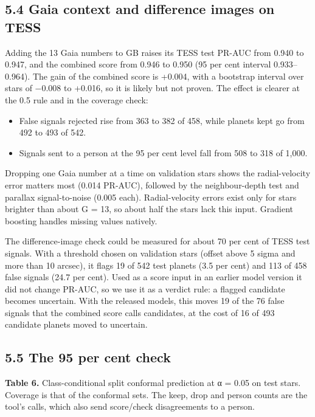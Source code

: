 \documentclass[
]{article}
\providecommand{\tightlist}{%
  \setlength{\itemsep}{0pt}\setlength{\parskip}{0pt}}
\begin{document}
\hypertarget{gaia-context-and-difference-images-on-tess}{%
\subsection{5.4 Gaia context and difference images on
TESS}\label{gaia-context-and-difference-images-on-tess}}

Adding the 13 Gaia numbers to GB raises its TESS test PR-AUC from 0.940
to 0.947, and the combined score from 0.946 to 0.950 (95 per cent
interval 0.933--0.964). The gain of the combined score is +0.004, with a
bootstrap interval over stars of −0.008 to +0.016, so it is likely but
not proven. The effect is clearer at the 0.5 rule and in the coverage
check:

\begin{itemize}
\tightlist
\item
  False signals rejected rise from 363 to 382 of 458, while planets kept
  go from 492 to 493 of 542.
\item
  Signals sent to a person at the 95 per cent level fall from 508 to 318
  of 1,000.
\end{itemize}

Dropping one Gaia number at a time on validation stars shows the
radial-velocity error matters most (0.014 PR-AUC), followed by the
neighbour-depth test and parallax signal-to-noise (0.005 each).
Radial-velocity errors exist only for stars brighter than about G = 13,
so about half the stars lack this input. Gradient boosting handles
missing values natively.

The difference-image check could be measured for about 70 per cent of
TESS test signals. With a threshold chosen on validation stars (offset
above 5 sigma and more than 10 arcsec), it flags 19 of 542 test planets
(3.5 per cent) and 113 of 458 false signals (24.7 per cent). Used as a
score input in an earlier model version it did not change PR-AUC, so we
use it as a verdict rule: a flagged candidate becomes uncertain. With
the released models, this moves 19 of the 76 false signals that the
combined score calls candidates, at the cost of 16 of 493 candidate
planets moved to uncertain.

\hypertarget{the-95-per-cent-check}{%
\subsection{5.5 The 95 per cent check}\label{the-95-per-cent-check}}

\textbf{Table 6.} Class-conditional split conformal prediction at α =
0.05 on test stars. Coverage is that of the conformal sets. The keep,
drop and person counts are the tool's calls, which also send score/check
disagreements to a person.
\end{document}
